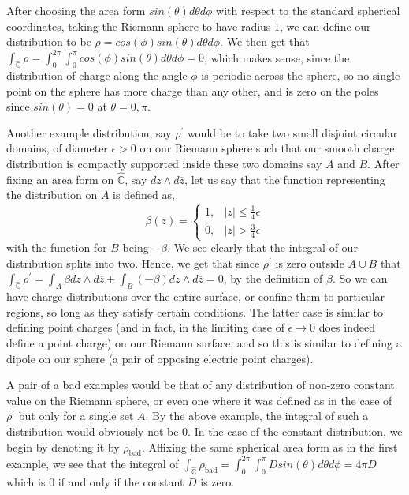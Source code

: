 \documentclass[11pt]{report}
\theoremstyle{definition}
\begin{document}
After choosing the area form $sin(\theta)d\theta d\phi$ with respect to the standard spherical coordinates, taking the Riemann sphere to have radius $1$, we can define our distribution to be $\rho = cos(\phi)sin(\theta)d\theta d\phi$. We then get that $\int_{\hat{\mathbb{C}}}\rho =\int_0^{2\pi}\int_0^{\pi}cos(\phi)sin(\theta)d\theta d\phi= 0$, which makes sense, since the distribution of charge along the angle $\phi$ is periodic across the sphere, so no single point on the sphere has more charge than any other, and is zero on the poles since $sin(\theta)=0$ at $\theta = 0,\pi$.

Another example distribution, say $\rho^{\prime}$ would be to take two small disjoint circular domains, of diameter $\epsilon > 0$ on our Riemann sphere such that our smooth charge distribution is compactly supported inside these two domains say $A$ and $B$. After fixing an area form on $\hat{\mathbb{C}}$, say $dz \wedge d\overline{z}$, let us say that the function representing the distribution on $A$ is defined as,
\[
\beta(z)=
\begin{cases}
  1, &|z| \leq \frac{1}{4}\epsilon \\
  0, &|z| > \frac{3}{4}\epsilon
\end{cases}
\]
with the function for $B$ being $-\beta$. We see clearly that the integral of our distribution splits into two. Hence, we get that since $\rho^{\prime}$ is zero outside $A \cup B$ that $\int_{\hat{\mathbb{C}}} \rho^{\prime} = \int_A \beta dz\wedge d\overline{z} + \int_B (-\beta) dz\wedge d\overline{z} = 0$, by the definition of $\beta$. So we can have charge distributions over the entire surface, or confine them to particular regions, so long as they satisfy certain conditions. The latter case is similar to defining point charges (and in fact, in the limiting case of $\epsilon \rightarrow 0$ does indeed define a point charge) on our Riemann surface, and so this is similar to defining a dipole on our sphere (a pair of opposing electric point charges). 

A pair of a bad examples would be that of any distribution of non-zero constant value on the Riemann sphere, or even one where it was defined as in the case of $\rho^{\prime}$ but only for a single set $A$. By the above example, the integral of such a distribution would obviously not be $0$. In the case of the constant distribution, we begin by denoting it by $\rho_{\text{bad}}$. Affixing the same spherical area form as in the first example, we see that the integral of $\int_{\hat{\mathbb{C}}} \rho_{\text{bad}} = \int_0^{2\pi}\int_0^{\pi}Dsin(\theta)d\theta d\phi = 4\pi D$ which is $0$ if and only if the constant $D$ is zero.
\end{document}

